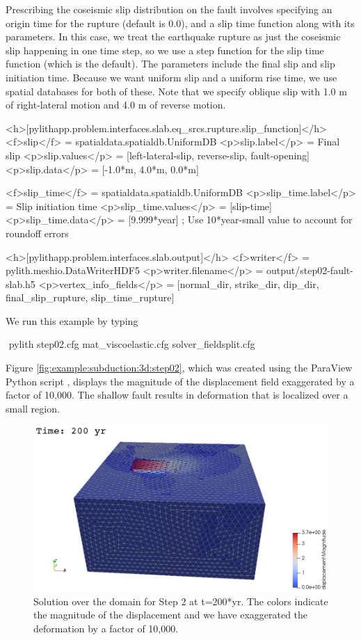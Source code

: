 Prescribing the coseismic slip distribution on the fault involves
specifying an origin time for the rupture (default is 0.0), and a slip
time function along with its
parameters. In this case, we treat the earthquake rupture as just the
coseismic slip happening in one time step, so we use a step function
for the slip time function (which is the default). The parameters
include the final slip and slip initiation time. Because we want
uniform slip and a uniform rise time, we use 
spatial databases for both of these. Note that we specify oblique slip
with 1.0 m of right-lateral motion and 4.0 m of reverse motion.
\begin{cfg}
<h>[pylithapp.problem.interfaces.slab.eq_srcs.rupture.slip_function]</h>
<f>slip</f> = spatialdata.spatialdb.UniformDB
<p>slip.label</p> = Final slip
<p>slip.values</p> = [left-lateral-slip, reverse-slip, fault-opening]
<p>slip.data</p> = [-1.0*m, 4.0*m, 0.0*m] 

<f>slip_time</f> = spatialdata.spatialdb.UniformDB
<p>slip_time.label</p>  = Slip initiation time
<p>slip_time.values</p> = [slip-time]
<p>slip_time.data</p> = [9.999*year] ; Use 10*year-small value to account for roundoff errors

<h>[pylithapp.problem.interfaces.slab.output]</h>
<f>writer</f> = pylith.meshio.DataWriterHDF5
<p>writer.filename</p> = output/step02-fault-slab.h5
<p>vertex_info_fields</p> = [normal_dir, strike_dir, dip_dir, final_slip_rupture, slip_time_rupture]
\end{cfg}

We run this example by typing
\begin{shell}
$$ pylith step02.cfg mat_viscoelastic.cfg solver_fieldsplit.cfg
\end{shell}

Figure \vref{fig:example:subduction:3d:step02}, which was created
using the ParaView Python script , displays
the magnitude of the displacement field exaggerated by a factor of 10,000.
The shallow fault results in deformation that is localized over a
small region.

\begin{figure}
  \includegraphics[width=5.0in]{examples/figs/subduction3d_step02_soln}
  \caption{Solution over the domain for Step 2 at t=200*yr. The colors indicate
    the magnitude of the displacement and we have exaggerated the
    deformation by a factor of 10,000.}
  \label{fig:example:subduction:3d:step02}
\end{figure}


